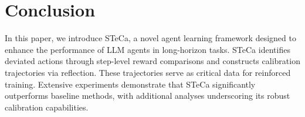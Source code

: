 \section{Conclusion}

In this paper, we introduce STeCa, a novel agent learning framework designed to enhance the performance of LLM agents in long-horizon tasks. 
STeCa identifies deviated actions through step-level reward comparisons and constructs calibration trajectories via reflection. 
These trajectories serve as critical data for reinforced training. Extensive experiments demonstrate that STeCa significantly outperforms baseline methods, with additional analyses underscoring its robust calibration capabilities.